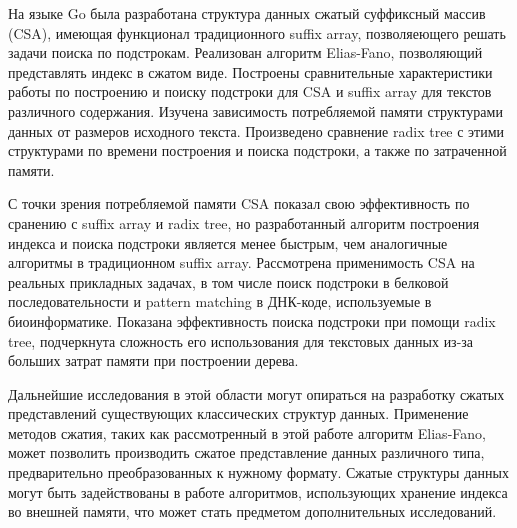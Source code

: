 
На языке Go была разработана структура данных сжатый суффиксный массив (CSA), имеющая
функционал традиционного suffix array, позволяеющего решать задачи поиска по подстрокам.
Реализован алгоритм Elias-Fano, позволяющий представлять индекс в сжатом виде.
Построены сравнительные характеристики работы по построению и поиску подстроки
для CSA и suffix array для текстов различного содержания.
Изучена зависимость потребляемой памяти структурами данных от размеров исходного текста.
Произведено сравнение radix tree с этими структурами по времени построения и поиска подстроки,
а также по затраченной памяти.

С точки зрения потребляемой памяти CSA показал свою эффективность по сранению с suffix array и radix tree,
но разработанный алгоритм построения индекса и поиска подстроки является менее быстрым,
чем аналогичные алгоритмы в традиционном suffix array. Рассмотрена применимость CSA на реальных
прикладных задачах, в том числе поиск подстроки в белковой последовательности
и pattern matching в ДНК-коде, используемые в биоинформатике.
Показана эффективность поиска подстроки при помощи radix tree,
подчеркнута сложность его использования для текстовых данных из-за больших
затрат памяти при построении дерева.

Дальнейшие исследования в этой области могут опираться на разработку сжатых представлений существующих
классических структур данных. Применение методов сжатия,
таких как рассмотренный в этой работе алгоритм Elias-Fano, может позволить производить сжатое представление
данных различного типа, предварительно преобразованных к нужному формату.
Сжатые структуры данных могут быть задействованы в работе алгоритмов,
использующих хранение индекса во внешней памяти, что может стать предметом дополнительных исследований.
